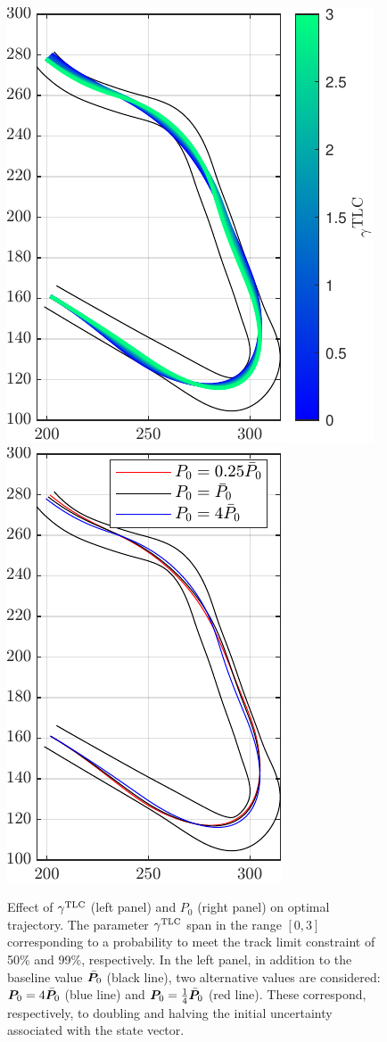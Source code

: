\begin{figure}
	\centering
	\includegraphics{Fig/gamma_sensitivity.pdf}
	\hfill
	\includegraphics{Fig/Pzero_sensitivity.pdf}
	\caption{Effect of $\gamma^\textrm{TLC}$ (left panel) and $P_0$ (right panel) on optimal trajectory. The parameter $\gamma^\textrm{TLC}$ span in the range $\left[0,3\right]$ corresponding to a probability to meet the track limit constraint of 50\% and 99\%, respectively. In the left panel, in addition to the baseline value $\bar{\boldsymbol{P}}_0$ (black line), two alternative values are considered: $\boldsymbol{P}_0 = 4\bar{\boldsymbol{P}}_0$ (blue line) and $\boldsymbol{P}_0 = \frac{1}{4}\bar{\boldsymbol{P}}_0$ (red line). These correspond, respectively, to doubling and halving the initial uncertainty associated with the state vector.}
	\label{fig:ol_sensitivities}
\end{figure}

